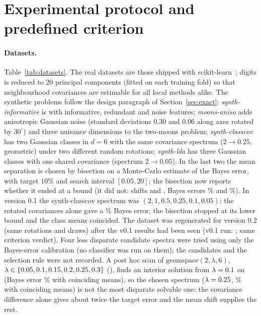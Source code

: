 \documentclass[10pt,a4paper]{article}
\theoremstyle{plain}
\theoremstyle{definition}
\theoremstyle{remark}
\begin{document}
\section{Experimental protocol and predefined criterion}\label{sec:protocol}

\paragraph{Datasets.} Table~\ref{tab:datasets}. The real datasets are those shipped with scikit-learn~\citep{fisher1936,street1993,pedregosa2011}; digits is reduced to 20 principal components (fitted on each training fold) so that neighbourhood covariances are estimable for all local methods alike. The synthetic problems follow the design paragraph of Section~\ref{sec:exact}: \emph{synth-informative} is  with informative, redundant and noise features; \emph{moons-aniso} adds anisotropic Gaussian noise (standard deviations $0.30$ and $0.06$ along axes rotated by $30^\circ$) and three nuisance dimensions to the two-moons problem; \emph{synth-classcov} has two Gaussian classes in $d=6$ with the same covariance spectrum ($2\to0.25$, geometric) under two different random rotations; \emph{synth-lda} has three Gaussian classes with one shared covariance (spectrum $2\to0.05$). In the last two the mean separation is chosen by bisection on a Monte-Carlo estimate of the Bayes error, with target $10\%$ and search interval $[0.05,20]$; the bisection now reports whether it ended at a bound (it did not: shifts \ShiftCcov{} and \ShiftSlda, Bayes errors \BayesCcov\% and \BayesSlda\%). In version 0.1 the synth-classcov spectrum was $(2,1,0.5,0.25,0.1,0.05)$: the rotated covariances alone gave a \VOneBayesCcov\% Bayes error, the bisection stopped at its lower bound and the class means coincided. The dataset was regenerated for version 0.2 (same rotations and draws) after the v0.1 results had been seen (v0.1 run: ; same criterion verdict). Four less disparate candidate spectra were tried using only the Bayes-error calibration (no classifier was run on them); the candidates and the selection rule were not recorded. A post hoc scan of $\mathrm{geomspace}(2,\lambda,6)$, $\lambda\in\{0.05, 0.1, 0.15, 0.2, 0.25, 0.3\}$ (), finds an interior solution from $\lambda=0.1$ on (Bayes error \SpecMinSolvableErr\% with coinciding means), so the chosen spectrum ($\lambda=0.25$, \SpecChosenErr\% with coinciding means) is not the most disparate solvable one: the covariance difference alone gives about twice the target error and the mean shift supplies the rest.
\end{document}
